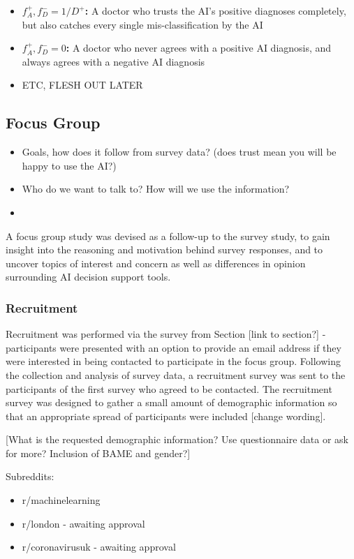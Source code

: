 \documentclass[manuscript,screen,review]{acmart}
\begin{document}
\begin{itemize}
    \item \textbf{$f^+_A, f^-_D = 1/D^+$:}  A doctor who trusts the AI's positive diagnoses completely, but also catches every single mis-classification by the AI
    \item \textbf{$f^+_A, f^-_D = 0$:}      A doctor who never agrees with a positive AI diagnosis, and always agrees with a negative AI diagnosis
    \item ETC, FLESH OUT LATER
\end{itemize}

\subsection{Focus Group}
\begin{itemize}
    \item Goals, how does it follow from survey data? (does trust mean you will be happy to use the AI?)
    \item Who do we want to talk to? How will we use the information?
    \item 
\end{itemize}

A focus group study was devised as a follow-up to the survey study, to gain insight into the reasoning and motivation behind survey responses, and to uncover topics of interest and concern as well as differences in opinion surrounding AI decision support tools.  



\subsubsection{Recruitment}

Recruitment was performed via the survey from Section [link to section?] - participants were presented with an option to provide an email address if they were interested in being contacted to participate in the focus group. Following the collection and analysis of survey data, a recruitment survey was sent to the participants of the first survey who agreed to be contacted. The recruitment survey was designed to gather a small amount of demographic information so that an appropriate spread of participants were included [change wording].

[What is the requested demographic information? Use questionnaire data or ask for more? Inclusion of BAME and gender?]

Subreddits:
\begin{itemize}
    \item r/machinelearning
    \item r/london - awaiting approval
    \item r/coronavirusuk - awaiting approval
\end{itemize}
\end{document}

